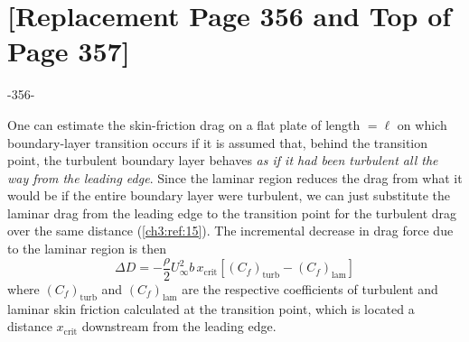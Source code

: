 
\chapter{[Replacement Page 356 and Top of Page 357]}\label{supp:ch3-356}

\begin{center}
-356-
\end{center}

One can estimate the skin-friction drag on a flat plate of length $= \ell$
on which boundary-layer transition occurs if it is assumed that, behind the
transition point, the turbulent boundary layer behaves \emph{as if it had been
turbulent all the way from the leading edge}. Since the laminar region reduces
the drag from what it would be if the entire boundary layer were turbulent,
we can just substitute the laminar drag from the leading edge to the
transition point for the turbulent drag over the same distance (\ref{ch3:ref:15}).
The incremental decrease in drag force due to the laminar region is then
\begin{equation*}\tag{97}
\Delta D = -\frac{\rho}{2}U_\infty^{2}b\,x_{\mathrm{crit}}
  \left[(C_f)_{\mathrm{turb}} - (C_f)_{\mathrm{lam}}\right]
\end{equation*}
where $(C_f)_{\mathrm{turb}}$ and $(C_f)_{\mathrm{lam}}$ are the respective coefficients of turbulent and
laminar skin friction calculated at the transition point, which is located a distance
$x_{\mathrm{crit}}$ downstream from the leading edge.

